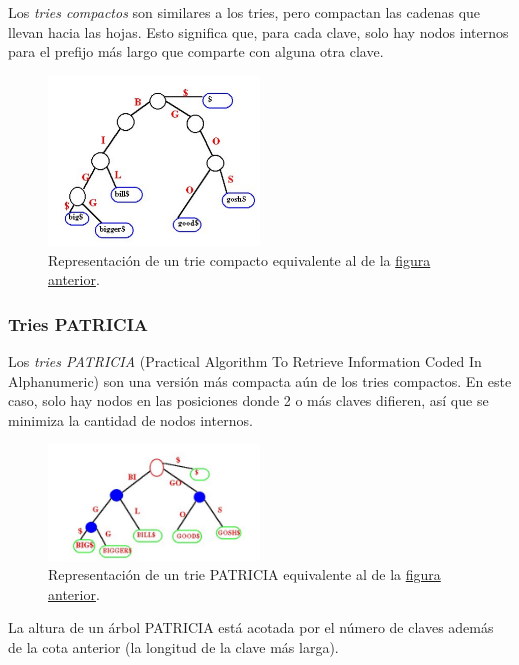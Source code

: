 \documentclass{article}
\begin{document}
    Los \textit{tries compactos} son similares a los tries, pero compactan las cadenas que llevan hacia las hojas. Esto significa que, para cada clave, solo hay nodos internos para el prefijo más largo que comparte con alguna otra clave.

    \begin{figure}[H]
        \centering
        \includegraphics[width=0.5\textwidth]{trie_compacto.png}
        \caption*{Representación de un trie compacto equivalente al de la \hyperref[fig-trie]{figura anterior}.}
    \end{figure}

    \subsubsection{Tries PATRICIA}

    Los \textit{tries PATRICIA} (Practical Algorithm To Retrieve Information Coded In
    Alphanumeric) son una versión más compacta aún de los tries compactos. En este caso, solo hay nodos en las posiciones donde 2 o más claves difieren, así que se minimiza la cantidad de nodos internos.

    \begin{figure}[H]
        \centering
        \includegraphics[width=0.5\textwidth]{trie_patricia.png}
        \caption*{Representación de un trie PATRICIA equivalente al de la \hyperref[fig-trie]{figura anterior}.}
    \end{figure}

    La altura de un árbol PATRICIA está acotada por el número de claves además de la cota anterior (la longitud de la clave más larga).
\end{document}
